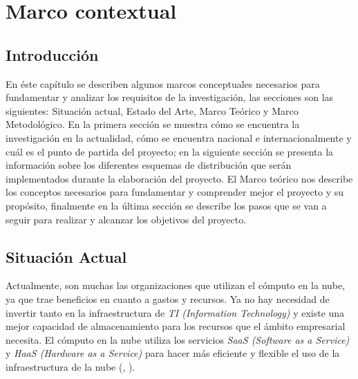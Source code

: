 
\chead{}
\rhead{\thepage}

\chapter{Marco contextual}
\section*{Introducci\'on}

En \'este cap\'itulo se describen algunos marcos conceptuales necesarios para fundamentar y analizar los requisitos de la investigaci\'on, las secciones son las siguientes: Situaci\'on actual, Estado del Arte, Marco Te\'orico y Marco Metodol\'ogico. En la primera secci\'on se muestra c\'omo se encuentra la investigaci\'on en la actualidad, c\'omo se encuentra nacional e internacionalmente y cu\'al es el punto de partida del proyecto; en la siguiente secci\'on se presenta la informaci\'on sobre los diferentes esquemas de distribuci\'on que ser\'an implementados durante la elaboraci\'on del proyecto. El Marco te\'orico nos describe los conceptos necesarios para fundamentar y comprender mejor el proyecto y su prop\'osito, finalmente en la \'ultima secci\'on se describe los pasos que se van a seguir para realizar y alcanzar los objetivos del proyecto.

\newpage


\section{Situaci\'on Actual}

Actualmente, son muchas las organizaciones que utilizan el c\'omputo en la nube, ya que trae beneficios en cuanto a gastos y recursos. Ya no hay necesidad de invertir tanto en la infraestructura de \textit{TI (Information Technology)} y existe una mejor capacidad de almacenamiento para los recursos que el \'ambito empresarial necesita.
El c\'omputo en la nube utiliza los servicios \textit{SaaS (Software as a Service)} y \textit{HaaS (Hardware as a Service)} para hacer m\'as eficiente y flexible el uso de la infraestructura de la nube (\citeauthor{mariscal2013computo}, \citeyear{mariscal2013computo}). 

